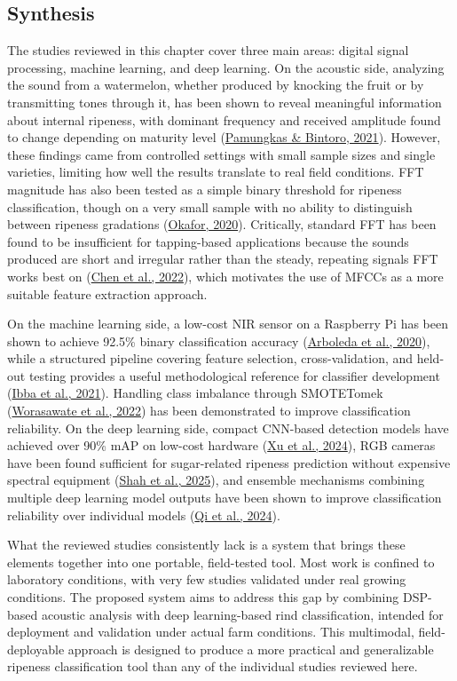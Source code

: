 \begin{thesisprose}
\section{Synthesis}

The studies reviewed in this chapter cover three main areas: digital signal processing, machine learning, and deep learning. On the acoustic side, analyzing the sound from a watermelon, whether produced by knocking the fruit or by transmitting tones through it, has been shown to reveal meaningful information about internal ripeness, with dominant frequency and received amplitude found to change depending on maturity level (\hyperlink{cite.pamungkas2021}{Pamungkas \& Bintoro, 2021}). However, these findings came from controlled settings with small sample sizes and single varieties, limiting how well the results translate to real field conditions. FFT magnitude has also been tested as a simple binary threshold for ripeness classification, though on a very small sample with no ability to distinguish between ripeness gradations (\hyperlink{cite.okafor2020}{Okafor, 2020}). Critically, standard FFT has been found to be insufficient for tapping-based applications because the sounds produced are short and irregular rather than the steady, repeating signals FFT works best on (\hyperlink{cite.chen2022}{Chen et al., 2022}), which motivates the use of MFCCs as a more suitable feature extraction approach.

On the machine learning side, a low-cost NIR sensor on a Raspberry Pi has been shown to achieve 92.5\% binary classification accuracy (\hyperlink{cite.arboleda2020}{Arboleda et al., 2020}), while a structured pipeline covering feature selection, cross-validation, and held-out testing provides a useful methodological reference for classifier development (\hyperlink{cite.ibba2021}{Ibba et al., 2021}). Handling class imbalance through SMOTETomek (\hyperlink{cite.worasawate2022}{Worasawate et al., 2022}) has been demonstrated to improve classification reliability. On the deep learning side, compact CNN-based detection models have achieved over 90\% mAP on low-cost hardware (\hyperlink{cite.xu2024}{Xu et al., 2024}), RGB cameras have been found sufficient for sugar-related ripeness prediction without expensive spectral equipment (\hyperlink{cite.shah2025}{Shah et al., 2025}), and ensemble mechanisms combining multiple deep learning model outputs have been shown to improve classification reliability over individual models (\hyperlink{cite.qi2024}{Qi et al., 2024}).

What the reviewed studies consistently lack is a system that brings these elements together into one portable, field-tested tool. Most work is confined to laboratory conditions, with very few studies validated under real growing conditions. The proposed system aims to address this gap by combining DSP-based acoustic analysis with deep learning-based rind classification, intended for deployment and validation under actual farm conditions. This multimodal, field-deployable approach is designed to produce a more practical and generalizable ripeness classification tool than any of the individual studies reviewed here.


\end{thesisprose}
